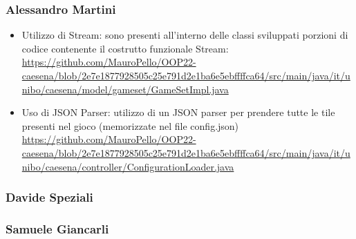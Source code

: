 \subsubsection*{Alessandro Martini}
\begin{itemize}
    \item Utilizzo di Stream: sono presenti all'interno delle classi sviluppati porzioni di codice contenente il costrutto funzionale Stream: \url{https://github.com/MauroPello/OOP22-caesena/blob/2e7e1877928505c25e791d2e1ba6e5ebffffca64/src/main/java/it/unibo/caesena/model/gameset/GameSetImpl.java}
    \item Uso di JSON Parser: utilizzo di un JSON parser per prendere tutte le tile presenti nel gioco (memorizzate nel file config.json) \url{https://github.com/MauroPello/OOP22-caesena/blob/2e7e1877928505c25e791d2e1ba6e5ebffffca64/src/main/java/it/unibo/caesena/controller/ConfigurationLoader.java}
\end{itemize}

\subsubsection*{Davide Speziali}

\subsubsection*{Samuele Giancarli}

